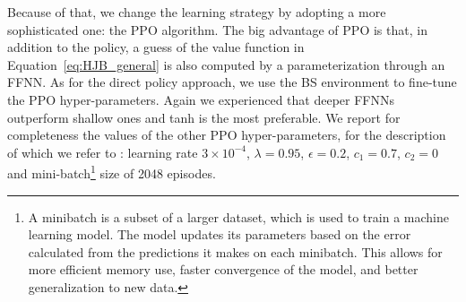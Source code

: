 \documentclass[runningheads]{m2ef}
\begin{document}
	Because of that, we change the learning strategy by adopting a more sophisticated one: the PPO algorithm. The big advantage of PPO is that, in addition to the policy, a guess of the value function in Equation~\eqref{eq:HJB_general} is also computed by a parameterization through an FFNN. As for the direct policy approach, we use the BS environment to fine-tune the PPO hyper-parameters. Again we experienced that deeper FFNNs outperform shallow ones and tanh is the most preferable. We report for completeness the values of the other PPO hyper-parameters, for the description of which we refer to \cite{Schulman2017}: learning rate $3\times 10^{-4}$, $\lambda=0.95$, $\epsilon=0.2$, $c_1=0.7$, $c_2=0$ and mini-batch\footnote{A minibatch is a subset of a larger dataset, which is used to train a machine learning model. The model updates its parameters based on the error calculated from the predictions it makes on each minibatch. This allows for more efficient memory use, faster convergence of the model, and better generalization to new data.} size of 2048 episodes.
\end{document}
